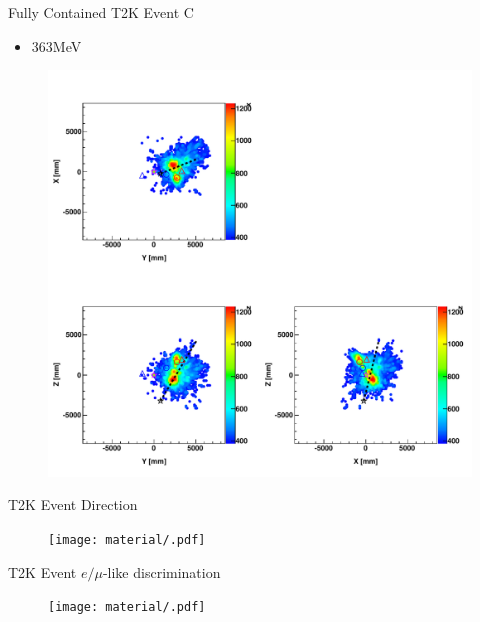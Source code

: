 \documentclass{beamer} %
\begin{document}
\begin{frame}{Fully Contained T2K Event C}
	\begin{itemize}
		\item 363MeV
	\end{itemize}
	\begin{figure}
		\includegraphics[width=\textwidth,height=0.9\textheight,keepaspectratio]
			{material/fom_map__run11339_evt39049330.pdf}
	\end{figure}
\end{frame}

\begin{frame}{T2K Event Direction}
	\begin{figure}
		\texttt{[image: material/.pdf]}
	\end{figure}
\end{frame}

\begin{frame}{T2K Event $e/\mu$-like discrimination}
	\begin{figure}
		\texttt{[image: material/.pdf]}
	\end{figure}
\end{frame}
\end{document}
